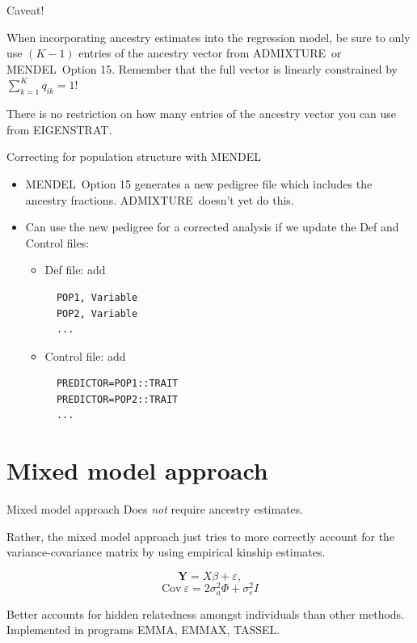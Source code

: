 \documentclass[serif,professionalfonts,svgnames]{beamer}
\newcommand{\admixture}{\textsc{ADMIXTURE}}
\newcommand{\eigenstrat}{\textsc{EIGENSTRAT}}
\newcommand{\mendel}{\textsc{MENDEL}}
\begin{document}
\begin{frame}{Caveat!}

  When incorporating ancestry estimates into the regression model, be sure to
  only use $(K-1)$ entries of the ancestry vector from \admixture\ or \mendel\
  Option 15. Remember that the full vector is linearly constrained by     
  $\sum_{k=1}^{K} q_{ik}=1$!
  
   There is no restriction on how many entries of the ancestry vector you can
  use from \eigenstrat.
  
\end{frame}




\begin{frame}[containsverbatim]
  {Correcting for population structure with \mendel}
  \begin{itemize}
    \item \mendel\ Option 15  generates a new pedigree file which 
          includes the ancestry fractions.  \admixture\ doesn't yet do 
          this.
    \item  Can use the new pedigree for a corrected analysis if we update the 
           Def and Control files:
              \begin{itemize}
                \item Def file: add 
                    \begin{Verbatim}
  POP1, Variable
  POP2, Variable
  ...
                    \end{Verbatim}
                \item Control file: add 
                    \begin{verbatim} 
  PREDICTOR=POP1::TRAIT 
  PREDICTOR=POP2::TRAIT
  ...
                    \end{verbatim}
            \end{itemize}
  \end{itemize}
\end{frame}



\section{Mixed model approach}
\begin{frame}{Mixed model approach}
  Does \emph{not} require ancestry estimates.

  Rather, the mixed model approach just tries to more
  correctly account for the variance-covariance matrix by using
  empirical kinship estimates.

  $$\mathbf{Y}=X\beta + \varepsilon,$$
  $$ \mathrm{Cov}~\varepsilon = 2 \sigma_a^2 \Phi + \sigma_e^2 I $$

  Better accounts for hidden relatedness amongst individuals than other methods.
  Implemented in programs EMMA, EMMAX, TASSEL.
\end{frame}
\end{document}
